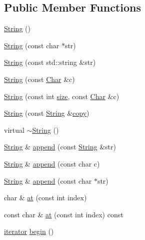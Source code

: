 \subsection*{Public Member Functions}
\begin{DoxyCompactItemize}
\item 
\hyperlink{classprism_1_1_string_a3a9df9dd5d297b91d2eec1ef7c4db8d3}{String} ()
\item 
\hyperlink{classprism_1_1_string_ad273f297c9125493c40876e368347fbf}{String} (const char $\ast$str)
\item 
\hyperlink{classprism_1_1_string_aedf9c8008bc992012ed8dea7b312683c}{String} (const std\+::string \&str)
\item 
\hyperlink{classprism_1_1_string_a15308d05157a15106dfa82ca9764ee30}{String} (const \hyperlink{classprism_1_1_char}{Char} \&c)
\item 
\hyperlink{classprism_1_1_string_adaf8ffdd5f77b21d8f11db6549fa7c17}{String} (const int \hyperlink{classprism_1_1_string_a603b5a90681d43adf7c6c29018e0300c}{size}, const \hyperlink{classprism_1_1_char}{Char} \&c)
\item 
\hyperlink{classprism_1_1_string_a6734cae1e3f2165a4a5d1f48cb56d0fe}{String} (const \hyperlink{classprism_1_1_string}{String} \&\hyperlink{namespaceprism_ae776f4cd825f79e7af1cf6ee1d90a209}{copy})
\item 
virtual \hyperlink{classprism_1_1_string_ab0114c8ba868b0facea3286d2764f010}{$\sim$\+String} ()
\item 
\hyperlink{classprism_1_1_string}{String} \& \hyperlink{classprism_1_1_string_af3c09c0f82ab5d85c78da4735f80fd6a}{append} (const \hyperlink{classprism_1_1_string}{String} \&str)
\item 
\hyperlink{classprism_1_1_string}{String} \& \hyperlink{classprism_1_1_string_abd1d707fe07b1e9565b77cf86b2fa5f5}{append} (const char c)
\item 
\hyperlink{classprism_1_1_string}{String} \& \hyperlink{classprism_1_1_string_a730e94334cafe06fb1e7f6c608bd1677}{append} (const char $\ast$str)
\item 
char \& \hyperlink{classprism_1_1_string_a2bbac16806974edd5c6d0d1d19ac7d5a}{at} (const int index)
\item 
const char \& \hyperlink{classprism_1_1_string_a55e86af07823ab80c1b6b0849231312b}{at} (const int index) const 
\item 
\hyperlink{classprism_1_1_string_adacc7975837e5fff95d70690777fb330}{iterator} \hyperlink{classprism_1_1_string_ae8f176fbe590422a3061552b8ed36ec5}{begin} ()

\end{DoxyCompactItemize}

